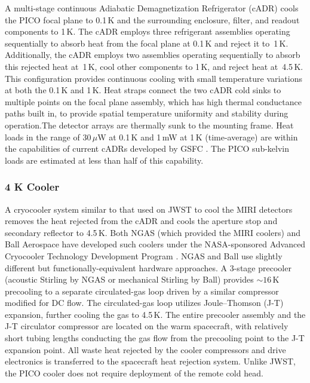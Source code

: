A multi-stage continuous Adiabatic Demagnetization Refrigerator (cADR)
cools the PICO focal plane to 0.1\,K and the surrounding enclosure,
filter, and readout components to 1\,K. The cADR employs three
refrigerant assemblies operating sequentially to absorb heat from the
focal plane at 0.1\,K and reject it to~1\,K. Additionally, the cADR
employs two assemblies operating sequentially to absorb this rejected
heat at~1\,K, cool other components to 1\,K, and reject heat at~4.5\,K. 
This configuration provides continuous cooling with small
temperature variations at both the 0.1\,K and 1\,K. Heat straps
connect the two cADR cold sinks to multiple points on the focal plane
assembly, which has high thermal conductance paths built in, to
provide spatial temperature uniformity and stability during
operation.The detector arrays are thermally sunk to the mounting
frame.  Heat loads in the range of 30\,$\mu$W at 0.1\,K and 1\,mW at
1\,K (time-average) are within the capabilities of current cADRs
developed by GSFC \citep{Shirron2012,Shirron2016}. The PICO sub-kelvin
loads are estimated at less than half of this capability.

\subsubsection{4 K Cooler}
\label{sec:4kcooler} %

A cryocooler system similar to that used on JWST to cool the MIRI
detectors \citep{Durand2008,Rabb2013} removes the heat rejected from
the cADR and cools the aperture stop and secondary reflector to
4.5\,K. Both NGAS (which provided the MIRI coolers) and Ball Aerospace
have developed such coolers under the NASA-sponsored Advanced
Cryocooler Technology Development Program \citep{Glaister2006}. NGAS
and Ball use slightly different but functionally-equivalent hardware
approaches. A 3-stage precooler (acoustic Stirling by NGAS or
mechanical Stirling by Ball) provides $\sim16$\,K precooling to a
separate circulated-gas loop driven by a similar compressor modified
for DC flow. The circulated-gas loop utilizes Joule--Thomson (J-T)
expansion, further cooling the gas to 4.5\,K. The entire precooler
assembly and the J-T circulator compressor are located on the warm
spacecraft, with relatively short tubing lengths conducting the gas
flow from the precooling point to the J-T expansion point. All waste
heat rejected by the cooler compressors and drive electronics is
transferred to the spacecraft heat rejection system. Unlike JWST, the
PICO cooler does not require deployment of the remote cold head.

